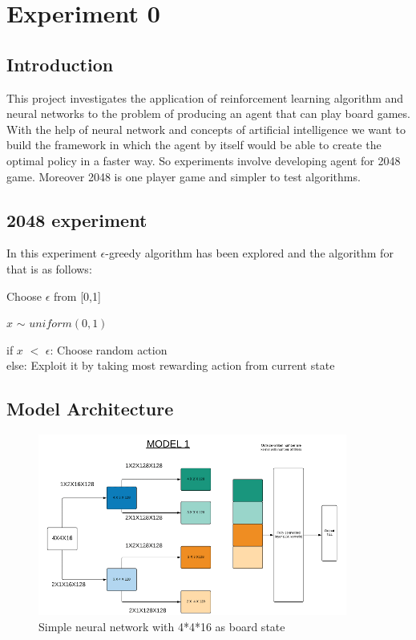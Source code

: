 \chapter{Experiment 0}
\section{Introduction}
This project investigates the application of reinforcement learning algorithm and neural networks to the problem of producing an agent that can play board games. With the help of neural network and concepts of artificial intelligence we want to build the framework in which the agent by itself would be able to create the optimal policy in a faster way. So experiments involve developing agent for 2048 game. Moreover 2048 is one player game and simpler to test algorithms.

\section{2048 experiment}
In this experiment $\epsilon$-greedy algorithm has been explored and the algorithm for that is as follows:

\begin{steps}
 \item Choose $\epsilon$ from [0,1] 
 \item $x$ $\sim$ $uniform(0,1)$
 \item if $x$ $<$ $\epsilon$:
 	Choose random action\\
 	else:
 	Exploit it by taking most rewarding action from current state
\end{steps}

\section{Model Architecture}

\begin{figure}
 	[!htb]\centering
    \includegraphics[width=4in]{images/model1.png}
    \caption{Simple neural network with 4*4*16 as board state}
  \label{fig:phase}
  \end{figure}


